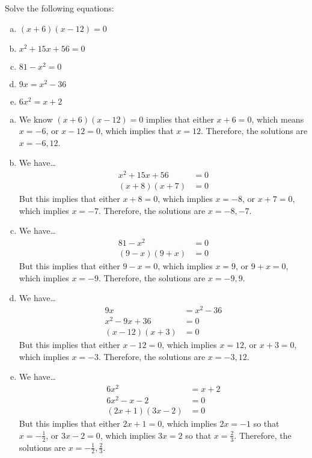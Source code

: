 \documentclass[11pt,letterpaper]{article}
\begin{document}

 Solve the following equations:
	\begin{enumerate}[(a)]
	\item $(x + 6)(x - 12)= 0$
	\item $x^2 + 15x + 56= 0$
	\item $81 - x^2= 0$
	\item $9x= x^2 - 36$
	\item $6x^2= x + 2$
	\end{enumerate} \pspace

\sol 
\begin{enumerate}[(a)]
\item We know $(x + 6)(x - 12)= 0$ implies that either $x + 6= 0$, which means $x= -6$, or $x - 12= 0$, which implies that $x= 12$. Therefore, the solutions are $x= -6, 12$. \pspace

\item We have\dots
	\[
	\begin{aligned}
	x^2 + 15x + 56&= 0 \\
	(x + 8)(x + 7)&= 0
	\end{aligned}
	\]
But this implies that either $x + 8=0$, which implies $x= -8$, or $x + 7= 0$, which implies $x= -7$. Therefore, the solutions are $x= -8, -7$. \pspace

\item We have\dots
	\[
	\begin{aligned}
	81 - x^2&= 0 \\
	(9 - x)(9 + x)&= 0 
	\end{aligned}
	\]
But this implies that either $9 - x= 0$, which implies $x= 9$, or $9 + x= 0$, which implies $x= -9$. Therefore, the solutions are $x= -9, 9$. \pspace

\item We have\dots
	\[
	\begin{aligned}
	9x&= x^2 - 36 \\
	x^2 - 9x + 36&= 0 \\
	(x - 12)(x + 3)&= 0 
	\end{aligned}
	\]
But this implies that either $x - 12= 0$, which implies $x= 12$, or $x + 3= 0$, which implies $x= -3$. Therefore, the solutions are $x= -3, 12$. \pspace

\item We have\dots
	\[
	\begin{aligned}
	6x^2&= x + 2 \\
	6x^2 - x - 2&= 0 \\
	(2x + 1)(3x - 2)&= 0 
	\end{aligned}
	\]
But this implies that either $2x + 1= 0$, which implies $2x= -1$ so that $x= -\frac{1}{2}$, or $3x - 2= 0$, which implies $3x= 2$ so that $x= \frac{2}{3}$. Therefore, the solutions are $x= -\frac{1}{2}, \frac{2}{3}$. 
\end{enumerate}
\end{document}
